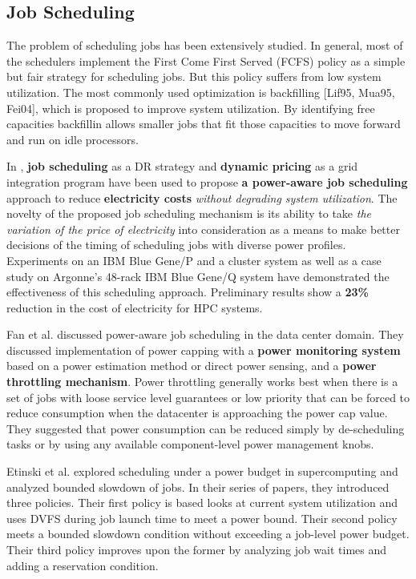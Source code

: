 \subsection{Job Scheduling}
The problem of scheduling jobs has been extensively studied. In general,
most of the schedulers implement the First Come First Served (FCFS) policy
as a simple but fair strategy for scheduling jobs. But this policy suffers
from low system utilization. The most commonly used optimization is backfilling
\cite{lifka_anl/ibm_1995} 
\cite{mualem_utilization_2001}
\cite{feitelson_parallel_2004}
[Lif95, Mua95, Fei04], which is proposed to improve system
utilization. By identifying free capacities backfillin allows smaller
jobs that fit those capacities to move forward and run on idle processors.

In \cite{yang_integrating_2013} \cite{zhou_reducing_2013}, \textbf{job scheduling} as a DR strategy and
\textbf{dynamic pricing} as a grid integration program have been used to
propose \textbf{a power-aware job scheduling} approach to reduce
\textbf{electricity costs} \textit{without degrading system utilization}. 
The novelty of the proposed job scheduling
mechanism is its ability to take \textit{the variation of 
the price of electricity }into consideration as a means to make
better decisions of the timing of scheduling jobs with diverse power
profiles. Experiments on an IBM Blue Gene/P and a cluster system as
well as a case study on Argonne's 48-rack IBM Blue Gene/Q system have
demonstrated the effectiveness of this scheduling approach. Preliminary
results show a \textbf{23{\%}} reduction in the cost of electricity for HPC systems.

Fan et al. \cite{PowerAwareServer1} discussed power-aware job scheduling in the data center domain. 
They discussed implementation of power capping with a \textbf{power monitoring system} based on a power estimation
method or direct power sensing, and a \textbf{power throttling mechanism}. Power throttling generally works best when there is 
a set of jobs with loose service level guarantees or low priority that can be
forced to reduce consumption when the datacenter is approaching the power cap value. They suggested that power consumption 
can be reduced simply by de-scheduling tasks or by using any available component-level power management knobs.

Etinski et al. \cite{Etinski1,Etinski2,Etinski3,Etinski4} explored scheduling under a power budget in supercomputing and analyzed bounded slowdown of jobs. In their series of papers, they introduced three policies. Their first policy is based looks at current system utilization and uses DVFS during job launch time to meet a power bound. Their second policy meets a bounded slowdown condition without exceeding a job-level power budget. Their third policy improves upon the former by analyzing job wait times and adding a reservation condition. 


